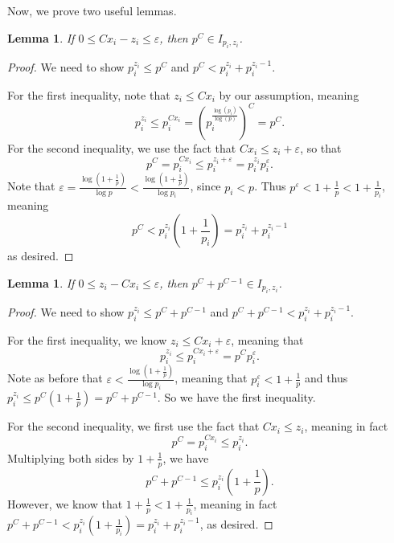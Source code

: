 \documentclass{article}
\newtheorem{lemma}[theorem]{Lemma}
\theoremstyle{definition}
\theoremstyle{remark}
\numberwithin{equation}{section}
\numberwithin{case}{theorem}
\begin{document}
Now, we prove two useful lemmas.

\begin{lemma} \label{lem:intervalone}
  If $0 \leq Cx_i - z_i \leq \varepsilon$, then $p^C \in I_{p_i, z_i}$.
\end{lemma}

\begin{proof}
  We need to show $p_i^{z_i} \leq p^C$ and $p^C < p_i^{z_i} + p_i^{z_i - 1}$.

  For the first inequality, note that $z_i \leq Cx_i$ by our assumption, meaning
  \[
    p_i^{z_i} \leq p_i^{Cx_i} = \left(p_i^{\frac{\log(p_i)}{\log(p)}}\right)^C = p^C.
  \]
  For the second inequality, we use the fact that $Cx_i \leq z_i + \varepsilon$, so that
  \[
    p^C = p_i^{Cx_i} \leq p_i^{z_i + \varepsilon} = p_i^{z_i} p_i^{\varepsilon}.
  \]
  Note that $\varepsilon = \frac{\log 
  \left(1 + \frac1p\right)}{\log p} < \frac{\log 
  \left(1 + \frac1p\right)}{\log {p_i}}$, since $p_i < p$. Thus $p^\varepsilon < 1 + \frac1p < 1 + \frac{1}{p_i}$, meaning
  \[
    p^C < p_i^{z_i} \left(1 + \frac{1}{p_i}\right) = p_i^{z_i} + p_i^{z_i - 1}
  \]
  as desired.
\end{proof}

\begin{lemma} \label{lem:intervaltwo}
  If $0 \leq z_i - Cx_i \leq \varepsilon$, then $p^C + p^{C-1} \in I_{p_i, z_i}$.
\end{lemma}

\begin{proof}
  We need to show $p_i^{z_i} \leq p^C + p^{C-1}$ and $p^C + p^{C-1} < p_i^{z_i} + p_i^{z_i-1}$.

  For the first inequality, we know $z_i \leq Cx_i + \varepsilon$, meaning that
  \[
    p_i^{z_i} \leq p_i^{Cx_i + \varepsilon} = p^C p_i^{\varepsilon}.
  \]
  Note as before that $\varepsilon < \frac{\log 
  \left(1 + \frac1p\right)}{\log {p_i}}$, meaning that $p_i^\varepsilon < 1 + \frac1p$ and thus $p_i^{z_i} \leq p^C\left(1 + \frac1p\right) = p^C + p^{C-1}$. So we have the first inequality.

  For the second inequality, we first use the fact that $Cx_i \leq z_i$, meaning in fact
  \[
    p^C = p_i^{Cx_i} \leq p_i^{z_i}.
  \]
  Multiplying both sides by $1 + \frac1p$, we have
  \[
    p^C + p^{C-1} \leq p_i^{z_i} \left(1 + \frac1p \right).
  \]
  However, we know that $1 + \frac1p < 1 + \frac{1}{p_i}$, meaning in fact $p^C + p^{C - 1} < p_i^{z_i}\left(1 + \frac1{p_i}\right) = p_i^{z_i} + p_i^{z_i-1}$, as desired.
\end{proof}
\end{document}
